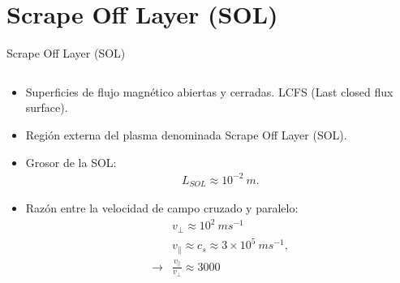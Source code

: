 \documentclass[11pt]{beamer}
\begin{document}
    \section{Scrape Off Layer (SOL)}
        \begin{frame}{Scrape Off Layer (SOL)}
        
        \fontsize{7pt}{9}\selectfont
        \begin{columns}
        \begin{column}{0.4\textwidth}
        \begin{block}{}
        \begin{itemize}
            \item Superficies de flujo magnético abiertas y cerradas. LCFS (Last closed flux surface).
            \item Región externa del plasma denominada Scrape Off Layer (SOL).
            \item Grosor de la SOL:
            \begin{align*}
               L_{SOL} \approx 10^{-2} \ m.
            \end{align*}
            \item Razón entre la velocidad de campo cruzado y paralelo:
            \begin{align*}
            &v_{\perp} \approx 10^2 \ ms^{-1} \\
            &v_{\parallel} \approx c_s \approx 3\times10^5 \ ms^{-1}, \\
         \rightarrow 
         &\frac{v_{\parallel}}{v_{\perp}}\approx 3000
            \end{align*}
        \end{itemize}
        \end{block}
        \end{column}
        

\end{columns}
\end{frame}
\end{document}
